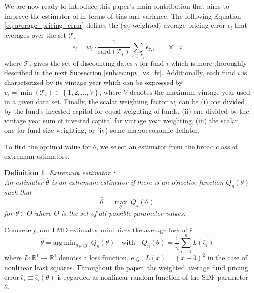 \documentclass[12pt]{article}
\newtheorem{definition}{Definition}
\begin{document}
We are now ready to introduce this paper's main contribution that aims to improve the estimator of \cite{DLP12} in terms of bias and variance.
The following Equation \ref{eq:average_pricing_error} defines the ($w_i$-weighted) average pricing error $\bar{\epsilon}_{i}$ that averages over the set $\mathcal{T}_i$
\begin{equation}
\label{eq:average_pricing_error}
\bar{\epsilon}_{i} =
w_{i} \cdot
\frac{1}{ \mathrm{card}(\mathcal{T}_{i}) }
\sum_{\tau \in \mathcal{T}_{i}}
\epsilon_{\tau,i}
\qquad \forall \quad i
\end{equation}
where $\mathcal{T}_i$ gives the set of discounting dates $\tau$ for fund $i$ which is more thoroughly described in the next Subsection \ref{subsec:npv_vs_fv}.
Additionally, each fund $i$ is characterized by its vintage year which can be expressed by $v_{i}=\min(\mathcal{T}_i) \in \left\{ 1,2,\dots,V \right\}$, where $V$ denotes the maximum vintage year used in a given data set.
Finally, the scalar weighting factor $w_i$ can be (i) one divided by the fund's invested capital for equal weighting of funds, (ii) one divided by the vintage year sum of invested capital for vintage year weighting, (iii) the scalar one for fund-size weighting, or (iv) some macroeconomic deflator.

To find the optimal value for $\theta$, we select an estimator from the broad class of extremum estimators.
\begin{definition}
	\label{def:extremum_estimator}
	Extremum estimator \cite[Equation 1.1]{NM94}: \\
	An estimator $\hat{\theta}$ is an extremum estimator if there is an objective function $Q_n(\theta)$ such that
	\[
	\hat{\theta} = \max_{\theta} \ Q_n(\theta)
	\]
	for $\theta \in \Theta$ where $\Theta$ is the set of all possible parameter values.
\end{definition}

Concretely, our LMD estimator \cite[Equation 7.1]{PP97} minimizes the average loss of $\bar{\epsilon}$
\begin{equation}
\label{eq:estimator}
\hat{\theta} = 
\mathrm{arg \ min}_{\theta \in \Theta}
\enspace
Q_n(\theta)
\quad
\mathrm{with}
\quad
Q_n(\theta) = 
\frac{1}{n}
\sum_{i=1}^n
L \left( \bar{\epsilon}_{i} \right) 
\end{equation}
where $L: \mathbb{R}^{1} \rightarrow \mathbb{R}^1$ denotes a loss function, e.g., $L(x)=(x-0)^2$ in the case of nonlinear least squares.
Throughout the paper, the weighted average fund pricing error $\bar{\epsilon}_i \equiv \bar{\epsilon}_i(\theta)$ is regarded as nonlinear random function of the SDF parameter $\theta$.
\end{document}
